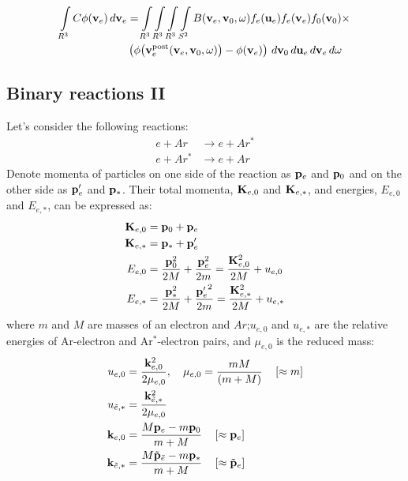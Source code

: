 \documentclass{article}[draft]
\begin{document}
\begin{align}
\myint_{R^3} C \phi\of{\vect{v}_e} \diff{\vect{v}_e} 
&=
\myint_{R^3} \myint_{R^3} \myint_{R^3} \myint_{S^2} 
B\of{\vect{v}_e, \vect{v}_0, \vect{\omega}} 
f_e\of{\vect{u}_e} f_e\of{\vect{v}_e} f_0\of{\vect{v}_0} \times \\
&\left(
\phi\of{\vect{v}_e^\text{post}\of{\vect{v}_e, \vect{v}_0, \vect{\omega}}} 
- \phi\of{\vect{v}_e} 
\right)
\diff{\vect{v}_0} \diff{\vect{u}_e} \diff{\vect{v}_e} \diff{\vect{\omega}}
\end{align}

\newpage
\subsection{Binary reactions II}

Let's consider the following reactions:
\begin{align*}
	e + Ar &\rightarrow e + Ar^{*} \\
	e + Ar^{*} &\rightarrow e + Ar
\end{align*}
Denote momenta of particles on one side of the reaction as $\mathbf{p}_e$ and $\mathbf{p}_0$ and on the other side as $\mathbf{p}_e^\prime$ and $\mathbf{p}_*$. Their total momenta, $\mathbf{K}_{e,0}$ and $\mathbf{K}_{e,*}$, and energies, $E_{e,0}$ and $E_{e, *}$, can be expressed as:
\begin{align*}
\mathbf{K}_{e,0} &= \mathbf{p}_0 + \mathbf{p}_e
\\
\mathbf{K}_{e,*} &= \mathbf{p}_* + \mathbf{p}_e^\prime
\\
E_{e,0} &= \frac{\mathbf{p}_0^2}{2M} + \frac{\mathbf{p}_e^2}{2m} 
= \frac{\mathbf{K}_{e,0}^2}{2M} + u_{e,0}
\\
E_{e,*} &= \frac{\mathbf{p}_*^2}{2M} + \frac{{\mathbf{p}_e^\prime}^2}{2m} 
= \frac{\mathbf{K}_{e,*}^2}{2M} + u_{e,*}
\end{align*}
where $m$ and $M$ are masses of an electron and $Ar$;$u_{e,0}$ and $u_{e,*}$ are the relative energies of Ar-electron and Ar$^*$-electron pairs, and $\mu_{e,0}$ is the reduced mass:
\begin{align*}
u_{e,0} &= \frac{\mathbf{k}_{e,0}^2}{2\mu_{e,0}}, \quad \mu_{e,0} = \frac{mM}{(m+M)}
\quad \left[ \approx m \right]
\\
u_{{\tilde{e}},*} &= \frac{\mathbf{k}_{{\tilde{e}},*}^2}{2\mu_{e,0}}
\\
\mathbf{k}_{e,0} &= \frac{M \mathbf{p}_e - m \mathbf{p}_0}{m+M} 
\quad \left[ \approx \mathbf{p}_{e} \right]
\\
\mathbf{k}_{{\tilde{e}},*} &= \frac{M \tilde{\mathbf{p}}_{\tilde{e}} - m \mathbf{p}_*}{m+M} 
\quad \left[ \approx \tilde{\mathbf{p}}_{e} \right]
\end{align*}
\end{document}
